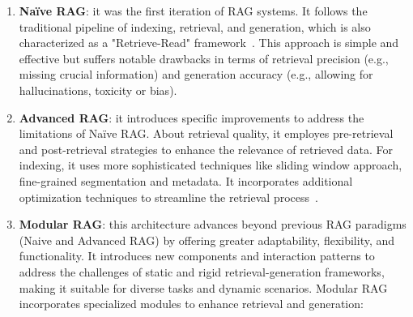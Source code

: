 \begin{enumerate}

	\item \textbf{Naïve RAG}: it was the first iteration of RAG systems. It follows the traditional pipeline of indexing, retrieval, and generation, which is also characterized as a "Retrieve-Read" framework~\cite{ma2023queryrewritingretrievalaugmentedlarge}. This approach is simple and effective but suffers notable drawbacks in terms of retrieval precision (e.g., missing crucial information) and generation accuracy (e.g., allowing for hallucinations, toxicity or bias).

	\item \textbf{Advanced RAG}: it introduces specific improvements to address the limitations of Naïve RAG. About retrieval quality, it employes pre-retrieval and post-retrieval strategies to enhance the relevance of retrieved data. For indexing, it uses more sophisticated techniques like sliding window approach, fine-grained segmentation and metadata. It incorporates additional optimization techniques to streamline the retrieval process~\cite{ilin2023rag}.

	\item {
	      \textbf{Modular RAG}: this architecture advances beyond previous RAG paradigms (Naive and Advanced RAG) by offering greater adaptability, flexibility, and functionality. It introduces new components and interaction patterns to address the challenges of static and rigid retrieval-generation frameworks, making it suitable for diverse tasks and dynamic scenarios.
	      Modular RAG incorporates specialized modules to enhance retrieval and generation:

}
\end{enumerate}
